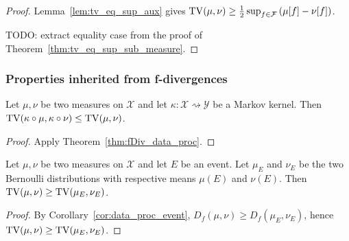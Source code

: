 \begin{proof}
Lemma~\ref{lem:tv_eq_sup_aux} gives $\operatorname{TV}(\mu, \nu) \ge \frac{1}{2} \sup_{f \in \mathcal F} \left( \mu[f] - \nu[f] \right)$.

TODO: extract equality case from the proof of Theorem~\ref{thm:tv_eq_sup_sub_measure}.
\end{proof}

\subsubsection{Properties inherited from f-divergences}

\begin{theorem}
  \label{thm:tv_data_proc}
  Let $\mu, \nu$ be two measures on $\mathcal X$ and let $\kappa : \mathcal X \rightsquigarrow \mathcal Y$ be a Markov kernel.
  Then $\operatorname{TV}(\kappa \circ \mu, \kappa \circ \nu) \le \operatorname{TV}(\mu, \nu)$.
\end{theorem}

\begin{proof}
Apply Theorem~\ref{thm:fDiv_data_proc}.
\end{proof}

\begin{lemma}
  \label{lem:tv_data_proc_event}
  Let $\mu, \nu$ be two measures on $\mathcal X$ and let $E$ be an event. Let $\mu_E$ and $\nu_E$ be the two Bernoulli distributions with respective means $\mu(E)$ and $\nu(E)$.
  Then $\operatorname{TV}(\mu, \nu) \ge \operatorname{TV}(\mu_E, \nu_E)$.
\end{lemma}

\begin{proof}
By Corollary~\ref{cor:data_proc_event}, $D_f(\mu, \nu) \ge D_f(\mu_E, \nu_E)$, hence $\operatorname{TV}(\mu, \nu) \ge \operatorname{TV}(\mu_E, \nu_E)$.
\end{proof}
